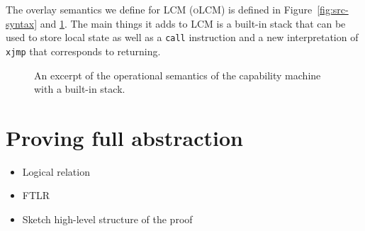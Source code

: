 \documentclass[acmsmall,review,anonymous]{acmart}\settopmatter{printfolios=true,printccs=false,printacmref=false}
\newcommand{\trgcm}{\textsc{LCM}}
\newcommand{\srccm}{\textsc{oLCM}}
\begin{document}
The overlay semantics we define for \trgcm{} (\srccm{}) is defined in Figure~\ref{fig:src-syntax} and \ref{fig:src-op-sem}.
The main things it adds to \trgcm{} is a built-in stack that can be used to store local state as well as a \texttt{call} instruction and a new interpretation of \texttt{xjmp} that corresponds to returning.

\begin{figure}[htb]
  \centering
  \label{fig:src-op-sem}
  \caption{An excerpt of the operational semantics of the capability machine with a built-in stack.}
\end{figure}











\section{Proving full abstraction}
\label{sec:fa-proof}

\begin{itemize}
\item Logical relation
\item FTLR
\item Sketch high-level structure of the proof
\end{itemize}
\end{document}
